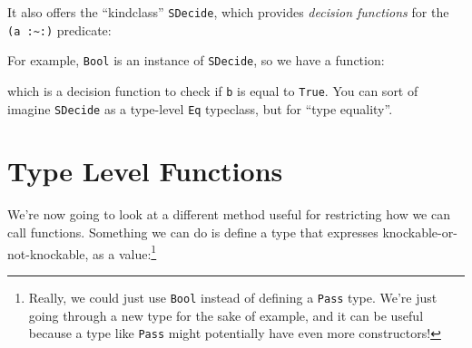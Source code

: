 \documentclass[]{article}
\newenvironment{Shaded}{}{}
\newcommand{\DataTypeTok}[1]{\textcolor[rgb]{0.56,0.13,0.00}{#1}}
\newcommand{\FunctionTok}[1]{\textcolor[rgb]{0.02,0.16,0.49}{#1}}
\newcommand{\KeywordTok}[1]{\textcolor[rgb]{0.00,0.44,0.13}{\textbf{#1}}}
\newcommand{\NormalTok}[1]{#1}
\newcommand{\OtherTok}[1]{\textcolor[rgb]{0.00,0.44,0.13}{#1}}
\begin{document}
It also offers the ``kindclass'' \texttt{SDecide}, which provides \emph{decision
functions} for the \texttt{(a\ :\textasciitilde{}:)} predicate:

\begin{Shaded}
\end{Shaded}

For example, \texttt{Bool} is an instance of \texttt{SDecide}, so we have a
function:

\begin{Shaded}
\end{Shaded}

which is a decision function to check if \texttt{b} is equal to
\texttt{\textquotesingle{}True}. You can sort of imagine \texttt{SDecide} as a
type-level \texttt{Eq} typeclass, but for ``type equality''.

\hypertarget{type-level-functions}{%
\section{Type Level Functions}\label{type-level-functions}}

We're now going to look at a different method useful for restricting how we can
call functions. Something we can do is define a type that expresses
knockable-or-not-knockable, as a value:\footnote{Really, we could just use
  \texttt{Bool} instead of defining a \texttt{Pass} type. We're just going
  through a new type for the sake of example, and it can be useful because a
  type like \texttt{Pass} might potentially have even more constructors!}

\begin{Shaded}
\end{Shaded}
\end{document}
